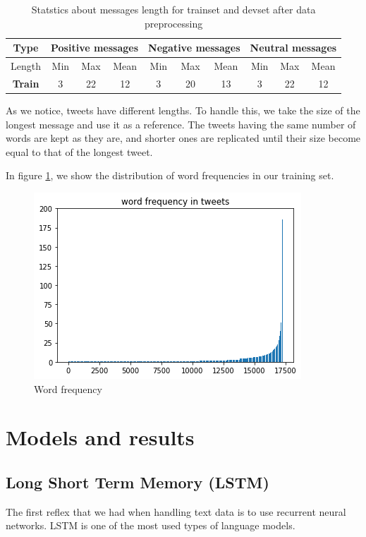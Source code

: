 \documentclass[a4paper,english,12pt]{article}
\begin{document}
\begin{table}[H]\centering
	\begin{tabular}{|c|c c c|c c c|c c c|}
		\hline \textbf{Type}  & \multicolumn{3}{|c|}{\textbf{Positive messages}} & \multicolumn{3}{|c|}{\textbf{Negative messages}} & \multicolumn{3}{|c|}{\textbf{Neutral messages}}\\    \hline
		Length & Min & Max & Mean & Min & Max & Mean & Min & Max & Mean\\   \hline
		\textbf{Train} & 3&22&12&3&20&13&3&22&12 \\
		\hline
	\end{tabular}
	\caption{Statstics about messages length for trainset and devset after data preprocessing}
\end{table}


As we notice, tweets have different lengths. To handle this, we take the size of the longest message and use it as a reference. The tweets having the same number of words are kept as they are, and shorter ones are replicated until their size become equal to that of the longest tweet.


In figure \ref{freq}, we show the distribution of word frequencies in our training set. 

\begin{figure}[h!]
\centering
\includegraphics[scale=1]{freq}
\caption{Word frequency}
\label{freq}
\end{figure}

\section{Models and results}
\subsection{Long Short Term Memory (LSTM)}
The first reflex that we had when handling text data is to use recurrent neural networks. LSTM is one of the most used types of language models.
\end{document}
